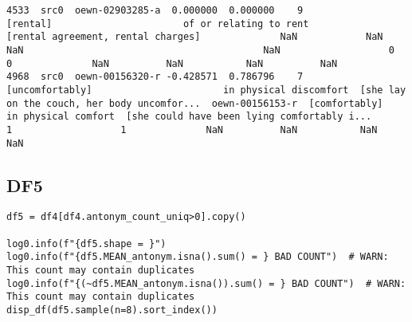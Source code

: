 \documentclass[a4paper,10pt,onecolumn,oneside,openright]{article}
\begin{document}
\begin{verbatim}
4533  src0  oewn-02903285-a  0.000000  0.000000    9                          [rental]                       of or relating to rent           [rental agreement, rental charges]              NaN            NaN                         NaN                                          NaN                   0                   0              NaN          NaN           NaN          NaN
4968  src0  oewn-00156320-r -0.428571  0.786796    7                   [uncomfortably]                       in physical discomfort  [she lay on the couch, her body uncomfor...  oewn-00156153-r  [comfortably]         in physical comfort  [she could have been lying comfortably i...                   1                   1              NaN          NaN           NaN          NaN
\end{verbatim}
\subsection{DF5}
\label{sec:org92ab6fc}
\begin{verbatim}
df5 = df4[df4.antonym_count_uniq>0].copy()

log0.info(f"{df5.shape = }")
log0.info(f"{df5.MEAN_antonym.isna().sum() = } BAD COUNT")  # WARN: This count may contain duplicates
log0.info(f"{(~df5.MEAN_antonym.isna()).sum() = } BAD COUNT")  # WARN: This count may contain duplicates
disp_df(df5.sample(n=8).sort_index())
\end{verbatim}
\end{document}
